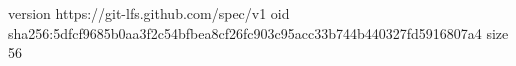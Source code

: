 version https://git-lfs.github.com/spec/v1
oid sha256:5dfcf9685b0aa3f2c54bfbea8cf26fc903c95acc33b744b440327fd5916807a4
size 56
